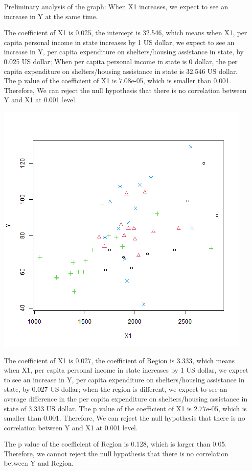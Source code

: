 \documentclass[12pt,letterpaper]{article}
\begin{document}
\begin{itemize}
Preliminary analysis of the graph: When X1 increases, we expect to see an increase in Y at the same time.

The coefficient of X1 is 0.025, the intercept is 32.546, which means when X1, per capita personal income in state increases by 1 US dollar, we expect to see an increase in Y, per capita expenditure on shelters/housing assistance in state, by 0.025 US dollar; When per capita personal income in state is 0 dollar, the per capita expenditure on shelters/housing assistance in state is 32.546 US dollar. 
The p value of the coefficient of X1 is 7.08e-05, which is smaller than 0.001. Therefore, We can reject the null hypothesis that there is no correlation between Y and X1 at 0.001 level.



 

\includegraphics[scale=.80]{Y ~ X1, colour, symbol.png}

The coefficient of X1 is 0.027, the coefficient of Region is 3.333, which means when X1, per capita personal income in state increases by 1 US dollar, we expect to see an increase in Y, per capita expenditure on shelters/housing assistance in state, by 0.027 US dollar; when the region is different, we expect to see an average difference in the per capita expenditure on shelters/housing assistance in state of 3.333 US dollar. 
The p value of the coefficient of X1 is 2.77e-05, which is smaller than 0.001. Therefore, We can reject the null hypothesis that there is no correlation between Y and X1 at 0.001 level. 

The p value of the coefficient of Region is 0.128, which is larger than 0.05.
Therefore, we cannot reject the null hypothesis that there is no correlation between Y and Region.

\end{itemize}
\end{document}
